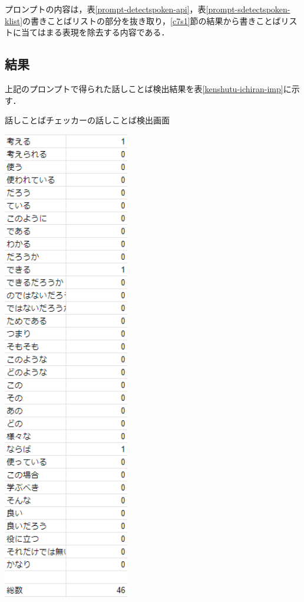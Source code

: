

プロンプトの内容は，表\ref{prompt-detectspoken-api}，表\ref{prompt-sdetectspoken-klist}の書きことばリストの部分を抜き取り，\ref{c7s1}節の結果から書きことばリストに当てはまる表現を除去する内容である．

\subsection{結果}
上記のプロンプトで得られた話しことば検出結果を表\ref{kenshutu-ichiran-imp}に示す．

\begin{table}[H]
	\centering
        \caption{話しことばチェッカーの話しことば検出画面}
 	\includegraphics[width=55mm]{image/kenshutu-ichiran-imp.png}
	\label{kenshutu-ichiran-imp}
\end{table}

